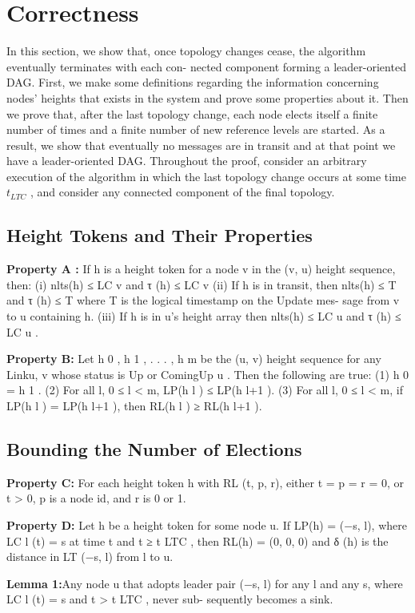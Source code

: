 \chapter{Correctness}
In this section, we show that, once topology changes
cease, the algorithm eventually terminates with each con-
nected component forming a leader-oriented DAG. First, we
make some definitions regarding the information concerning nodes’ heights that exists in the system and prove some
properties about it. Then we prove that, after the last topology change, each node elects itself a finite number of times
and a finite number of new reference levels are started. As
a result, we show that eventually no messages are in transit
and at that point we have a leader-oriented DAG.
Throughout the proof, consider an arbitrary execution of
the algorithm in which the last topology change occurs at
some time $t_{LTC}$ , and consider any connected component of
the final topology.

\section{Height Tokens and Their Properties}
\textbf{Property A :} If h is a height token for a node v in the (v, u)
height sequence, then:
(i) nlts(h) ≤ LC v and τ (h) ≤ LC v
(ii) If h is in transit, then
nlts(h) ≤ T and τ (h) ≤ T
where T is the logical timestamp on the Update mes-
sage from v to u containing h.
(iii) If h is in u’s height array then
nlts(h) ≤ LC u and τ (h) ≤ LC u .

\textbf{Property B:} Let h 0 , h 1 , . . . , h m be the (u, v) height sequence
for any Link{u, v} whose status is Up or ComingUp u . Then
the following are true:
(1) h 0 = h 1 .
(2) For all l, 0 ≤ l < m, LP(h l ) ≤ LP(h l+1 ).
(3) For all l, 0 ≤ l < m, if LP(h l ) = LP(h l+1 ), then
RL(h l ) ≥ RL(h l+1 ).

\section{Bounding the Number of Elections}
\textbf{Property C:} For each height token h with RL (t, p, r), either
t = p = r = 0, or t > 0, p is a node id, and r is 0 or 1.

\textbf{Property D:} Let h be a height token for some node u. If
LP(h) = (−s, l), where LC l (t) = s at time t and t ≥ t LTC ,
then RL(h) = (0, 0, 0) and δ (h) is the distance in LT (−s, l)
from l to u.


\textbf{Lemma 1:}Any node u that adopts leader pair (−s, l) for
any l and any s, where LC l (t) = s and t > t LTC , never sub-
sequently becomes a sink.

